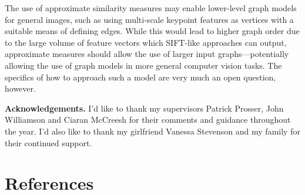 \documentclass{mpaper}
\begin{document}
The use of approximate similarity measures may enable lower-level graph models for general images, such as using multi-scale keypoint features as vertices with a suitable means of defining edges.
While this would lead to higher graph order due to the large volume of feature vectors which SIFT-like approaches can output, approximate measures should allow the use of larger input graphs---potentially allowing the use of graph models in more general computer vision tasks.
The specifics of how to approach such a model are very much an open question, however.

\noindent
{\bf Acknowledgements.}
I'd like to thank my supervisors Patrick Prosser, John Williamson and Ciaran McCreesh for their comments and guidance throughout the year.
I'd also like to thank my girlfriend Vanessa Stevenson and my family for their continued support.

\section{References}
\renewcommand*{\bibfont}{\footnotesize}
\printbibliography[heading=none]

\vspace{1em}
\end{document}
